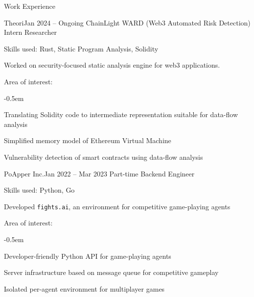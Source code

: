 \documentclass{resume}
\begin{document}
\begin{res-section}{Work Experience}
  \begin{res-subsection}{Theori}{Jan 2024 -- Ongoing}
    ChainLight WARD (Web3 Automated Risk Detection) Intern Researcher

    \item Skills used: Rust, Static Program Analysis, Solidity

    \item Worked on security-focused static analysis engine for web3 applications.

    \item Area of interest:
    \vspace{-0.5em}
    \begin{list}{--}{}
      \itemsep -0.5em
      \item Translating Solidity code to intermediate representation suitable for data-flow analysis
      \item Simplified memory model of Ethereum Virtual Machine
      \item Vulnerability detection of smart contracts using data-flow analysis
    \end{list}
  \end{res-subsection}

  \begin{res-subsection}{PoApper Inc.}{Jan 2022 -- Mar 2023}
    Part-time Backend Engineer

    \item Skills used: Python, Go

    \item Developed \texttt{fights.ai}, an environment for competitive game-playing agents

    \item Area of interest:
    \vspace{-0.5em}
    \begin{list}{--}{}
      \itemsep -0.5em
      \item Developer-friendly Python API for game-playing agents
      \item Server infrastructure based on message queue for competitive gameplay
      \item Isolated per-agent environment for multiplayer games
    \end{list}
  \end{res-subsection}
\end{res-section}
\end{document}
